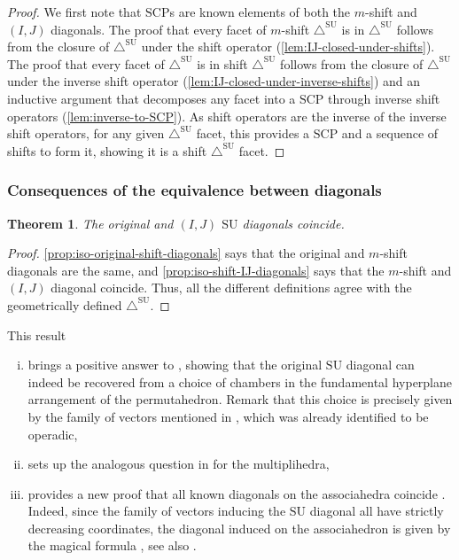 \documentclass{amsart}
\newtheorem{theorem}{Theorem}[section]
\theoremstyle{definition}
\newcommand{\SU}{\mathrm{SU}}
\newcommand{\SUD}{\triangle^{\mathrm{SU}}}
\newcommand{\SCP}{\mathrm{SCP}}
\begin{document}
\begin{proof}
    We first note that $\SCP$s are known elements of both the $m$-shift and $(I,J)$ diagonals.
    The proof that every facet of $m$-shift $\SUD$ is in $\SUD$ follows from the closure of $\SUD$ under the shift operator (\cref{lem:IJ-closed-under-shifts}).
    The proof that every facet of $\SUD$ is in shift $\SUD$ follows from the closure of $\SUD$ under the inverse shift operator (\cref{lem:IJ-closed-under-inverse-shifts}) and an inductive argument that decomposes any facet into a $\SCP$ through inverse shift operators (\cref{lem:inverse-to-SCP}).
    As shift operators are the inverse of the inverse shift operators, for any given $\SUD$ facet, this provides a $\SCP$ and a sequence of shifts to form it, showing it is a shift $\SUD$ facet.
\end{proof}


\subsubsection{Consequences of the equivalence between diagonals}

\begin{theorem}
    The original and $(I,J)$ $\SU$ diagonals coincide.
\end{theorem}

\begin{proof}
    \cref{prop:iso-original-shift-diagonals} says that the original and $m$-shift diagonals are the same, and \cref{prop:iso-shift-IJ-diagonals} says that the $m$-shift and $(I,J)$ diagonal coincide.
    Thus, all the different definitions agree with the geometrically defined $\SUD$. 
\end{proof}

This result
\begin{enumerate}[(i)]
    \item brings a positive answer to \cite[Remark 2.19]{LA21}, showing that the original $\SU$ diagonal can indeed be recovered from a choice of chambers in the fundamental hyperplane arrangement of the permutahedron. 
    Remark that this choice is precisely given by the family of vectors mentioned in \cite[Remark 4.19]{LA21}, which was already identified to be operadic,
    \item sets up the analogous question in \cite[Remark 3.9]{MazuirLA22} for the multiplihedra,
    \item provides a new proof that all known diagonals on the associahedra coincide \cite{saneblidzeComparingDiagonalsAssociahedra2022}.
    Indeed, since the family of vectors inducing the $\SU$ diagonal all have strictly decreasing coordinates, the diagonal induced on the associahedron is given by the magical formula \cite[Theorem 2]{masudaDiagonalAssociahedra2021}, see also \cite[Proposition 3.8]{LA21}.
\end{enumerate}
\end{document}
